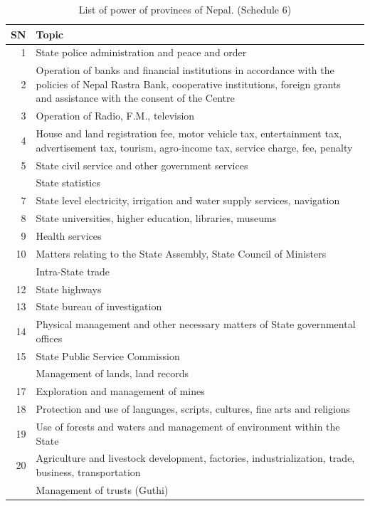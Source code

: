 \documentclass[
  openany]{book}
\begin{document}
\begin{longtable}[t]{r>{\raggedright\arraybackslash}p{35em}}
\caption{\label{tab:power-division-province}List of power of provinces of Nepal. (Schedule 6)}\\
\toprule
SN & Topic\\
\midrule
1 & State police administration and peace and order\\
2 & Operation of banks and financial institutions in accordance with the policies of Nepal Rastra Bank, cooperative institutions, foreign grants and assistance with the consent of the Centre\\
3 & Operation of Radio, F.M., television\\
4 & House and land registration fee, motor vehicle tax, entertainment tax, advertisement tax, tourism, agro-income tax, service charge, fee, penalty\\
5 & State civil service and other government services\\
\addlinespace
6 & State statistics\\
7 & State level electricity, irrigation and water supply services, navigation\\
8 & State universities, higher education, libraries, museums\\
9 & Health services\\
10 & Matters relating to the State Assembly, State Council of Ministers\\
\addlinespace
11 & Intra-State trade\\
12 & State highways\\
13 & State bureau of investigation\\
14 & Physical management and other necessary matters of State governmental offices\\
15 & State Public Service Commission\\
\addlinespace
16 & Management of lands, land records\\
17 & Exploration and management of mines\\
18 & Protection and use of languages, scripts, cultures, fine arts and religions\\
19 & Use of forests and waters and management of environment within the State\\
20 & Agriculture and livestock development, factories, industrialization, trade, business, transportation\\
\addlinespace
21 & Management of trusts (Guthi)\\
\bottomrule
\end{longtable}
\endgroup{}
\end{document}
